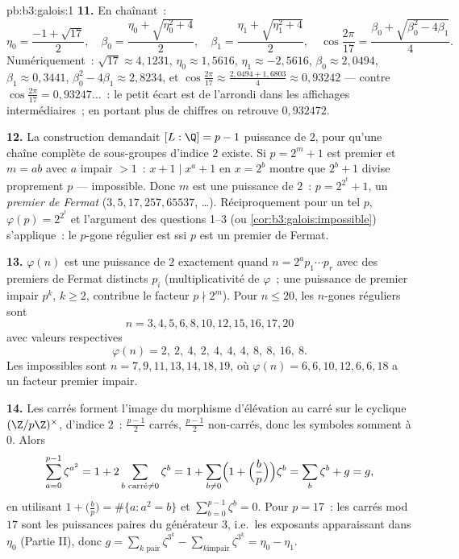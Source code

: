 \begin{solution}{pb:b3:galois:1}
\textbf{11.} En chaînant~:
\[
\eta_0 = \frac{-1 + \sqrt{17}}2,
\quad
\beta_0 = \frac{\eta_0 + \sqrt{\eta_0^2 + 4}}2,
\quad
\beta_1 = \frac{\eta_1 + \sqrt{\eta_1^2 + 4}}2,
\quad
\cos\frac{2\pi}{17} = \frac{\beta_0 + \sqrt{\beta_0^2 -
4\beta_1}}4 .
\]
Numériquement~: $\sqrt{17} \approx 4{,}1231$, $\eta_0 \approx
1{,}5616$, $\eta_1 \approx -2{,}5616$, $\beta_0 \approx
2{,}0494$, $\beta_1 \approx 0{,}3441$, $\beta_0^2 - 4\beta_1
\approx 2{,}8234$, et $\cos\frac{2\pi}{17} \approx
\frac{2{,}0494 + 1{,}6803}4 \approx 0{,}93242$ --- contre
$\cos\frac{2\pi}{17} = 0{,}93247\dots$~: le petit écart est de
l'arrondi dans les affichages intermédiaires~; en portant plus
de chiffres on retrouve $0{,}932472$.

\textbf{12.} La construction demandait $[L:\Q] = p - 1$
puissance de $2$, pour qu'une chaîne complète de sous-groupes
d'indice $2$ existe. Si $p = 2^m + 1$ est premier et $m = ab$
avec $a$ impair $> 1$~: $x + 1 \mid x^a + 1$ en $x = 2^b$
montre que $2^b + 1$ divise proprement $p$ --- impossible.
Donc $m$ est une puissance de $2$~: $p = 2^{2^t} + 1$, un
\emph{premier de Fermat} ($3, 5, 17, 257, 65537$, \dots).
Réciproquement pour un tel $p$, $\varphi(p) = 2^{2^t}$ et
l'argument des questions 1--3 (ou
\cref{cor:b3:galois:impossible}) s'applique~: le $p$-gone
régulier est  ssi $p$ est un premier de Fermat.

\textbf{13.} $\varphi(n)$ est une puissance de $2$ exactement
quand $n = 2^a p_1\cdots p_r$ avec des premiers de Fermat
distincts $p_i$ (multiplicativité de $\varphi$~; une puissance
de premier impair $p^k$, $k \geq 2$, contribue le facteur $p
\nmid 2^m$). Pour $n \leq 20$, les $n$-gones réguliers
 sont
\[
n = 3, 4, 5, 6, 8, 10, 12, 15, 16, 17, 20
\]
avec valeurs respectives
\[
\varphi(n) = 2,\ 2,\ 4,\ 2,\ 4,\ 4,\ 4,\ 8,\ 8,\ 16,\ 8 .
\]
Les impossibles sont $n = 7, 9, 11, 13, 14, 18, 19$, où
$\varphi(n) = 6, 6, 10, 12, 6, 6, 18$ a un facteur premier
impair.

\textbf{14.} Les carrés forment l'image du morphisme
d'élévation au carré sur le cyclique $(\Z/p\Z)^\times$,
d'indice $2$~: $\frac{p-1}2$ carrés, $\frac{p-1}2$ non-carrés,
donc les symboles somment à $0$. Alors
\[
\sum_{a=0}^{p-1}\zeta^{a^2} = 1 + 2\sum_{b \text{ carré}
\neq 0}\zeta^b
= 1 + \sum_{b\neq0}\Bigl(1 + \Bigl(\frac bp\Bigr)\Bigr)
\zeta^b = \sum_{b}\zeta^b + g = g,
\]
en utilisant $1 + \bigl(\frac bp\bigr) = \#\{a : a^2 = b\}$ et
$\sum_{b=0}^{p-1}\zeta^b = 0$. Pour $p = 17$~: les carrés mod
$17$ sont les puissances paires du générateur $3$, i.e.\ les
exposants apparaissant dans $\eta_0$ (Partie II), donc $g =
\sum_{\text{$k$ pair}}\zeta^{3^k} - \sum_{\text{$k$
impair}} \zeta^{3^k} = \eta_0 - \eta_1$.


\end{solution}
